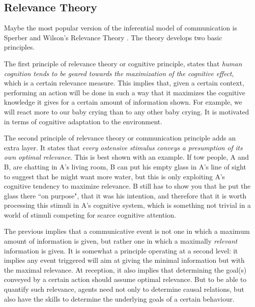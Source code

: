 \documentclass[
		twoside,openright,titlepage,numbers=noenddot,manychapters,
		headinclude,%
                footinclude=false,cleardoublepage=empty,
                BCOR=5mm,
		fontsize=11pt, %
                 enabledeprecatedfontcommands]{scrreprt}
\begin{document}
\subsection{Relevance Theory}
Maybe the most popular version of the inferential model of communication is Sperber and Wilson's Relevance Theory \cite[]{sperber2004rt}. The theory develops two basic principles.

The first principle of relevance theory or cognitive principle, states that \emph{human cognition tends to be geared towards the maximization of the cognitive effect}, which is a certain relevance measure. This implies that, given a certain context, performing an action will be done in such a way that it maximizes the cognitive knowledge it gives for a certain amount of information shown. For example, we will react more to our baby crying than to any other baby crying. It is motivated in terms of cognitive adaptation to the environment.



The second principle of relevance theory or communication principle adds an extra layer. It states that \emph{every ostensive stimulus conveys a presumption of its own optimal relevance}. This is best shown with an example. If tow people, A and B, are chatting in A's living room, B can put his empty glass in A's line of sight to suggest that he might want more water, but this is only exploiting A's cognitive tendency to maximize relevance. B still has to show you that he put the glass there ``on purpose", that it was his intention, and therefore that it is worth processing this stimuli in A's cognitive system, which is something not trivial in a world of stimuli competing for scarce cognitive attention.

The previous implies that a communicative event is not one in which a maximum amount of information is given, but rather one in which a maximally \emph{relevant} information is given. 
It is somewhat a principle operating at a second level: it implies any event triggered will aim at giving the minimal information but with the maximal relevance. At reception, it also implies that determining the goal(s) conveyed by a certain action should assume optimal relevance. But to be able to quantify such relevance, agents need not only to determine causal relations, but also have the skills to determine the underlying goals of a certain behaviour.
\end{document}
